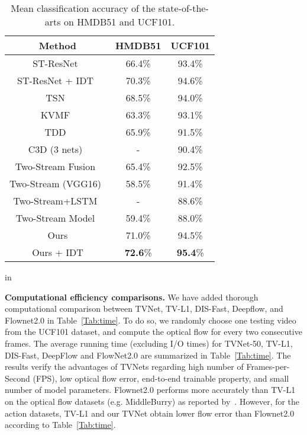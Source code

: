 \documentclass[10pt,twocolumn,letterpaper]{article}
\begin{document}
\begin{table}[t!]
\centering
\caption{Mean classification accuracy of the state-of-the-arts on HMDB51 and UCF101.}
\label{Tab:without-IDT}
\renewcommand{\arraystretch}{0.8}
\tabcolsep 8pt \begin{tabular}{ccc}
\toprule
  Method                                       & HMDB51      & UCF101      \\ \hline
  ST-ResNet~\cite{Feichtenhofer_NIPS16}        & 66.4\%      &  93.4\%     \\
  ST-ResNet + IDT~\cite{Feichtenhofer_NIPS16}                           & 70.3\%       & 94.6\%     \\
  TSN~\cite{Wang_ECCV16}                       & 68.5\%       &   94.0\%   \\
  KVMF~\cite{Wangjiang}                        &  63.3\%     & 93.1\%      \\
  TDD~\cite{wang2015action}              & 65.9\%       & 91.5\%     \\
C3D (3 nets)~\cite{tran2015learning}            & -     &  90.4\%           \\
  Two-Stream Fusion~\cite{Feichtenhofer_CVPR16}& 65.4\%      & 92.5\%      \\
  Two-Stream (VGG16)~\cite{ballas2015delving}  & 58.5\%      & 91.4\%     \\
  Two-Stream+LSTM~\cite{Ng_CVPR15}             &  -          & 88.6\%      \\
  Two-Stream Model~\cite{Simonyan_NIPS14}      & 59.4\%      & 88.0\%      \\

  \hline
Ours                           & 71.0\%      &  94.5\%     \\
  Ours + IDT                     & \textbf{72.6}\%      &  \textbf{95.4}\%     \\
  \bottomrule
\end{tabular}
 in
\end{table}

\textbf{Computational efficiency comparisons.}
We have added thorough computational comparison between TVNet, TV-L1, DIS-Fast, Deepflow, and Flownet2.0 in Table~\ref{Tab:time}.  To do so, we randomly choose one testing video from the UCF101 dataset, and compute the optical flow for every two consecutive frames. The average running time (excluding I/O times) for TVNet-50, TV-L1, DIS-Fast, DeepFlow and FlowNet2.0 are summarized in Table~\ref{Tab:time}.
The results verify the advantages of TVNets regarding high number of Frames-per-Second (FPS), low optical flow error, end-to-end trainable property, and small number of model parameters.
Flownet2.0 performs more accurately than TV-L1 on the optical flow datasets (e.g. MiddleBurry) as reported by~\cite{ilg2016flownet}. However,
for the action datasets, TV-L1 and our TVNet obtain lower flow error than Flownet2.0 according to Table~\ref{Tab:time}.
\end{document}
